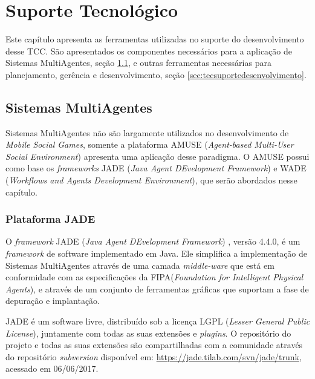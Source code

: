 \chapter{Suporte Tecnológico}
\label{chapter:suporteTecnologico}

Este capítulo apresenta as ferramentas utilizadas no suporte do desenvolvimento
desse TCC. São apresentados os componentes necessários para a aplicação de
Sistemas MultiAgentes, seção \ref{sec:tecmultiagentes}, e outras ferramentas
necessárias para planejamento, gerência e desenvolvimento, seção
\ref{sec:tecsuportedesenvolvimento}.

\section{Sistemas MultiAgentes}
\label{sec:tecmultiagentes}

Sistemas MultiAgentes não são largamente utilizados no desenvolvimento de
\textit{Mobile Social Games}, somente a plataforma AMUSE (\textit{Agent-based
Multi-User Social Environment}) apresenta uma aplicação desse paradigma. O AMUSE
possui como base os \textit{frameworks} JADE (\textit{Java Agent DEvelopment
Framework}) e WADE (\textit{Workflows and Agents Development Environment}), que
serão abordados nesse capítulo.

    \subsection{Plataforma JADE}
    \label{sec:jadePlatform}

O \textit{framework} JADE (\textit{Java Agent DEvelopment Framework})
\cite{jade}, versão 4.4.0, é um \textit{framework} de software implementado em
Java. Ele simplifica a implementação de Sistemas MultiAgentes através de uma
camada \textit{middle-ware} que está em conformidade com as especificações da
FIPA(\textit{Foundation for Intelligent Physical Agents}), e através de um
conjunto de ferramentas gráficas que suportam a fase de depuração e implantação.

JADE é um software livre, distribuído sob a licença LGPL (\textit{Lesser General
Public License}), juntamente com todas as suas extensões e \textit{plugins}. O
repositório do projeto e todas as suas extensões são compartilhadas com a
comunidade através do repositório \textit{subversion} disponível em:
\url{https://jade.tilab.com/svn/jade/trunk}, acessado em 06/06/2017.

